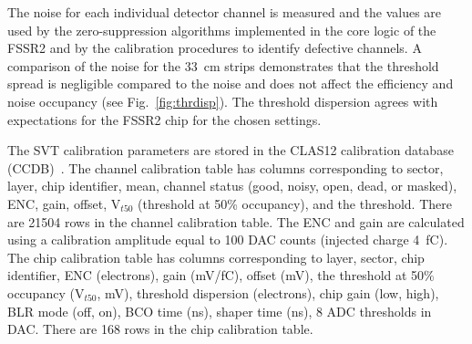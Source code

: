 The noise for each individual detector channel is measured and the values are used by the zero-suppression
algorithms implemented in the core logic of the FSSR2 and by the calibration procedures to identify defective
channels. A comparison of the noise for the 33~cm strips demonstrates that the threshold spread is negligible
compared  to the noise and does not affect the efficiency and noise occupancy (see Fig.~\ref{fig:thrdisp}). The
threshold dispersion agrees with expectations for the FSSR2 chip for the chosen settings.

The SVT calibration parameters are stored in the CLAS12 calibration database (CCDB)~\cite{recon-nim}. The
channel calibration table has columns corresponding to sector, layer, chip identifier, mean, channel status (good,
noisy, open, dead, or masked), ENC, gain, offset, V$_{t50}$ (threshold at 50\% occupancy), and the threshold.
There are 21504 rows in the channel calibration table. The ENC and gain are calculated using a calibration amplitude
equal to 100 DAC counts (injected charge 4~fC). The chip calibration table has columns corresponding to layer, sector,
chip identifier, ENC (electrons), gain (mV/fC), offset (mV), the threshold at 50$\%$ occupancy (V$_{t50}$, mV),
threshold dispersion (electrons), chip gain (low, high), BLR mode (off, on), BCO time (ns), shaper time (ns), 8 ADC
thresholds in DAC. There are 168 rows in the chip calibration table. 

